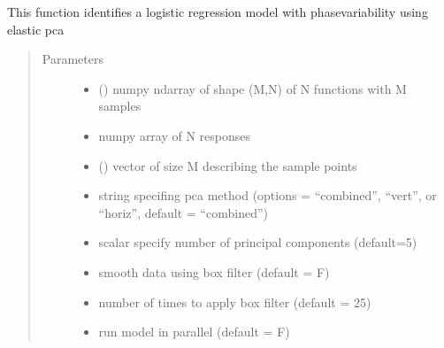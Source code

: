 \documentclass[letterpaper,10pt,english]{sphinxmanual}
\begin{document}
\begin{fulllineitems}
\begin{fulllineitems}
\label{\detokenize{pcr_regression:pcr_regression.elastic_mlpcr_regression.calc_model}}
This function identifies a logistic regression model with phase\sphinxhyphen{}variability
using elastic pca
\begin{quote}\begin{description}
\item[{Parameters}] \leavevmode\begin{itemize}
\item {} 
 () \textendash{} numpy ndarray of shape (M,N) of N functions with M samples

\item {} 
 \textendash{} numpy array of N responses

\item {} 
 () \textendash{} vector of size M describing the sample points

\item {} 
 \textendash{} string specifing pca method (options = “combined”,
“vert”, or “horiz”, default = “combined”)

\item {} 
 \textendash{} scalar specify number of principal components (default=5)

\item {} 
 \textendash{} smooth data using box filter (default = F)

\item {} 
 \textendash{} number of times to apply box filter (default = 25)

\item {} 
 \textendash{} run model in parallel (default = F)


\end{itemize}
\end{description}
\end{quote}
\end{fulllineitems}
\end{fulllineitems}
\end{document}
